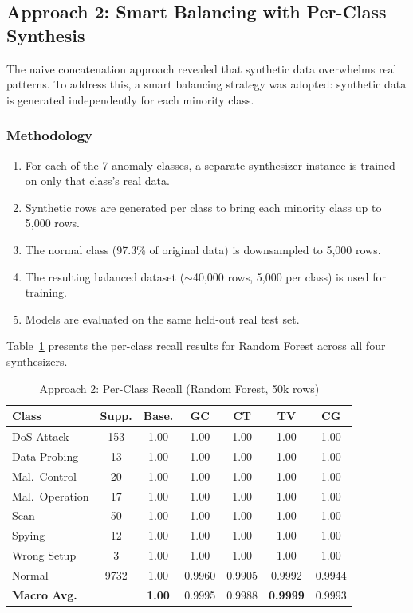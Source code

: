 \documentclass[conference]{IEEEtran}
\begin{document}
\subsection{Approach 2: Smart Balancing with Per-Class Synthesis}
The naive concatenation approach revealed that synthetic data overwhelms real patterns. To address this, a smart balancing strategy was adopted: synthetic data is generated independently for each minority class.

\subsubsection{Methodology}
\begin{enumerate}
    \item For each of the 7 anomaly classes, a separate synthesizer instance is trained on only that class's real data.
    \item Synthetic rows are generated per class to bring each minority class up to 5,000 rows.
    \item The normal class (97.3\% of original data) is downsampled to 5,000 rows.
    \item The resulting balanced dataset ($\sim$40,000 rows, 5,000 per class) is used for training.
    \item Models are evaluated on the same held-out real test set.
\end{enumerate}

Table~\ref{tab:approach2} presents the per-class recall results for Random Forest across all four synthesizers.

\begin{table}[htbp]
\caption{Approach 2: Per-Class Recall (Random Forest, 50k rows)}
\label{tab:approach2}
\centering
\begin{tabular}{l c c c c c c}
\toprule
\textbf{Class} & \textbf{Supp.} & \textbf{Base.} & \textbf{GC} & \textbf{CT} & \textbf{TV} & \textbf{CG} \\
\midrule
DoS Attack     & 153  & 1.00 & 1.00 & 1.00 & 1.00 & 1.00 \\
Data Probing   & 13   & 1.00 & 1.00 & 1.00 & 1.00 & 1.00 \\
Mal.\ Control  & 20   & 1.00 & 1.00 & 1.00 & 1.00 & 1.00 \\
Mal.\ Operation& 17   & 1.00 & 1.00 & 1.00 & 1.00 & 1.00 \\
Scan           & 50   & 1.00 & 1.00 & 1.00 & 1.00 & 1.00 \\
Spying         & 12   & 1.00 & 1.00 & 1.00 & 1.00 & 1.00 \\
Wrong Setup    & 3    & 1.00 & 1.00 & 1.00 & 1.00 & 1.00 \\
Normal         & 9732 & 1.00 & 0.9960 & 0.9905 & 0.9992 & 0.9944 \\
\midrule
\textbf{Macro Avg.} & & \textbf{1.00} & 0.9995 & 0.9988 & \textbf{0.9999} & 0.9993 \\
\bottomrule
\end{tabular}
\end{table}
\end{document}

